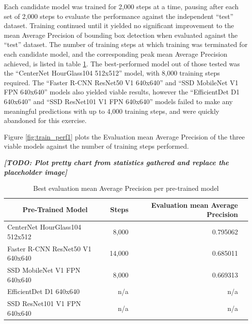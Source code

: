 \documentclass[11pt,twoside]{report}
\newcommand{\remark}[1]{{\bf \em [\marginpar{$\Leftarrow$}#1]}}
\begin{document}
Each candidate model was trained for 2,000 steps at a time, pausing after each set of 2,000 steps to evaluate the performance against the independent ``test'' dataset.  Training continued until it yielded no significant improvement to the mean Average Precision of bounding box detection when evaluated against the ``test'' dataset.  The number of training steps at which training was terminated for each candidate model, and the corresponding peak mean Average Precision achieved, is listed in table \ref{table1}.  The best-performed model out of those tested was the ``CenterNet HourGlass104 512x512'' model, with 8,000 training steps required.  The ``Faster R-CNN ResNet50 V1 640x640'' and ``SSD MobileNet V1 FPN 640x640'' models also yielded viable results, however the ``EfficientDet D1 640x640'' and ``SSD ResNet101 V1 FPN 640x640'' models failed to make any meaningful predictions with up to 4,000 training steps, and were quickly abandoned for this exercise.

Figure \ref{fig:train_perf1} plots the Evaluation mean Average Precision of the three viable models against the number of training steps performed.

\remark{TODO: Plot pretty chart from statistics gathered and replace the placeholder image}


\begin{table}[h]
\centering
\begin{tabular}{|l|r|r|r|}
\hline
\multicolumn{1}{|c|}{\bfseries Pre-Trained Model} & \textbf{Steps} & \textbf{Evaluation mean Average Precision} \\
\hline
CenterNet HourGlass104 512x512 & 8,000 & 0.795062 \\
Faster R-CNN ResNet50 V1 640x640 & 14,000 & 0.685011 \\
SSD MobileNet V1 FPN 640x640 & 8,000 & 0.669313 \\
EfficientDet D1 640x640 & n/a & n/a \\
SSD ResNet101 V1 FPN 640x640 & n/a & n/a \\
\hline
\end{tabular}
\caption{Best evaluation mean Average Precision per pre-trained model}
\label{table1}
\end{table}
\end{document}
